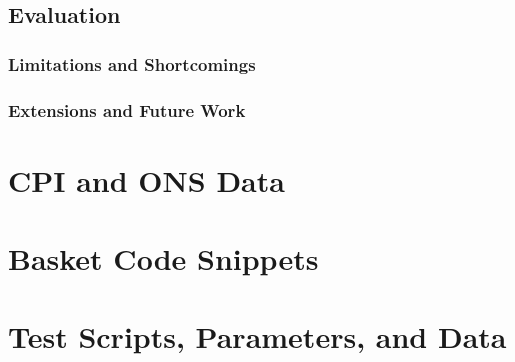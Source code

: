 \documentclass[bsc,frontabs,singlespacing,parskip,deptreport]{infthesis}
\begin{document}
\section{Evaluation}
    \subsection{Limitations and Shortcomings}
    \subsection{Extensions and Future Work}



\appendix
\chapter{CPI and ONS Data}

\chapter{Basket Code Snippets}

\chapter{Test Scripts, Parameters, and Data}
\end{document}
